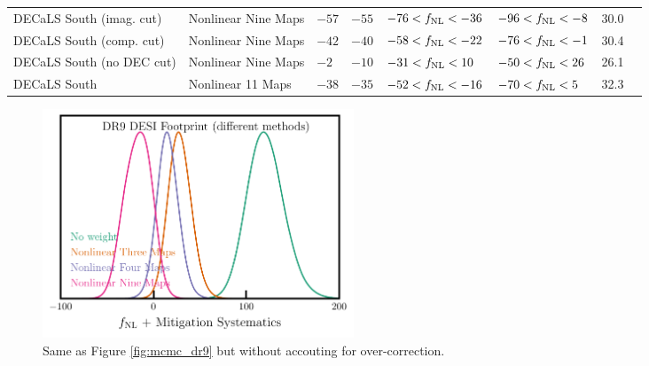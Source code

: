 \begin{table}
{\begin{tabular}{llllllll}
DECaLS South (imag. cut) & Nonlinear Nine Maps& $   -57$& $   -55$& $   -76<f_{\rm NL}<   -36$& $   -96<f_{\rm NL}<    -8$ &   30.0\\
DECaLS South (comp. cut) & Nonlinear Nine Maps& $   -42$& $   -40$& $   -58<f_{\rm NL}<   -22$& $   -76<f_{\rm NL}<    -1$ &   30.4\\
DECaLS South (no DEC cut) & Nonlinear Nine Maps& $    -2$& $   -10$& $   -31<f_{\rm NL}<    10$& $   -50<f_{\rm NL}<    26$ &   26.1\\
DECaLS South & Nonlinear 11 Maps        & $   -38$& $   -35$& $   -52<f_{\rm NL}<   -16$& $   -70<f_{\rm NL}<     5$ &   32.3\\    
   \hline
    \end{tabular}}
\end{table}



\begin{figure}
    \centering
    \includegraphics[width=0.45\textwidth]{figures/mcmc_dr9methods1dnoshift.pdf}
    \caption{Same as Figure \ref{fig:mcmc_dr9}  but without accouting for over-correction. }
    \label{fig:mcmcdr9noshift}
\end{figure}


